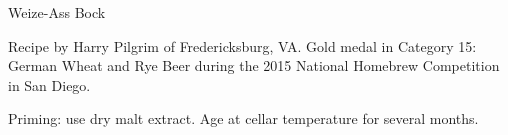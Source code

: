 \begin{recipe}{Weize-Ass Bock} %

\begin{aboutblock}
Recipe by Harry Pilgrim of Fredericksburg, VA. Gold medal in Category 15: German
Wheat and Rye Beer during the 2015 National Homebrew Competition in San Diego.
\sourceaha
\end{aboutblock}


\begin{methodandtiming}

\begin{mashsteps}
\end{mashsteps}

\begin{fermentationsteps}
\end{fermentationsteps}

\begin{directions}
Priming: use dry malt extract. Age at cellar temperature for several months.
\end{directions}

\end{methodandtiming}

\recipebreak

\begin{ingredientsblock}

\begin{malts}
\end{malts}

\begin{hops}
\end{hops}


\end{ingredientsblock}

\end{recipe}

